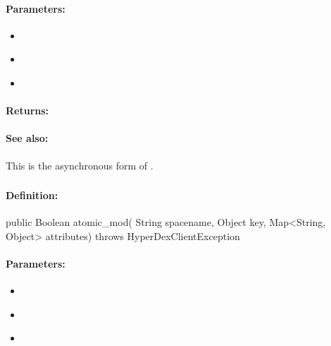 \paragraph{Parameters:}
\begin{itemize}[noitemsep]
\item {}\\

\item {}\\

\item {}\\

\end{itemize}

\paragraph{Returns:}


\paragraph{See also:}  This is the asynchronous form of .

\pagebreak
\subsubsection{}
\label{api:java:atomic_mod}


\paragraph{Definition:}
\begin{javacode}
public Boolean atomic_mod(
        String spacename,
        Object key,
        Map<String, Object> attributes) throws HyperDexClientException
\end{javacode}

\paragraph{Parameters:}
\begin{itemize}[noitemsep]
\item {}\\

\item {}\\

\item {}\\

\end{itemize}

